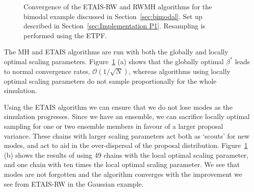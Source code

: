 \documentclass[final]{siamltex}
\begin{document}
\begin{figure}[htb]
\centering
{}
\caption{Convergence of the ETAIS-RW and RWMH algorithms for the
bimodal example discussed in Section~\ref{sec:bimodal}. Set up
described in Section~\ref{sec:Implementation P1}. Resampling is
performed using the ETPF.}
\label{fig:BM2_L2}
\end{figure}

The MH and ETAIS algorithms are run with both the globally and locally
optimal scaling parameters. Figure~\ref{fig:BM2_L2} (a) shows that the
globally optimal $\beta^*$ leads to normal convergence rates,
$\mathcal{O}(1/\sqrt{N})$, whereas algorithms using locally optimal
scaling parameters do not sample
proportionally for the whole simulation.

Using the ETAIS algorithm we can ensure that we do not lose modes as the
simulation progresses. Since we have an ensemble, we can sacrifice
locally optimal sampling for one or two ensemble members in favour of
a larger proposal variance. These chains with larger scaling
parameters act both as `scouts' for new modes, and act to aid in the
over-dispersal of the proposal distribution. Figure~\ref{fig:BM2_L2}
(b) shows the results of using 49 chains with the local optimal
scaling parameter, and one chain with ten times the local optimal
scaling parameter. We see that modes are not forgotten and the
algorithm converges with the improvement we see from ETAIS-RW in the
Gaussian example.
\end{document}
